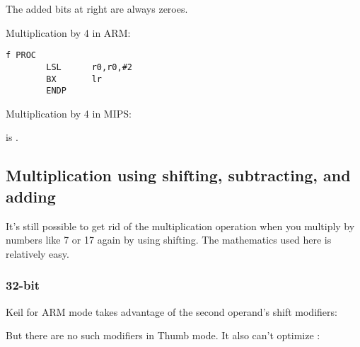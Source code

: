 The added bits at right are always zeroes.

Multiplication by 4 in ARM:

\begin{lstlisting}[caption=\NonOptimizingKeilVI (\ARMMode)]
f PROC
        LSL      r0,r0,#2
        BX       lr
        ENDP
\end{lstlisting}

Multiplication by 4 in MIPS:



 is .

\subsection{Multiplication using shifting, subtracting, and adding}
\label{multiplication_using_shifts_adds_subs}

It's still possible to get rid of the multiplication operation when you multiply by numbers like
7 or 17 again by using shifting.
The mathematics used here is relatively easy.

\subsubsection{32-bit}







Keil for ARM mode takes advantage of the second operand's shift modifiers:



But there are no such modifiers in Thumb mode.
It also can't optimize :






